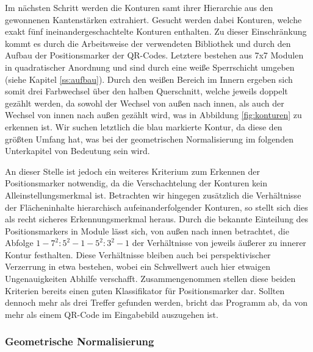 \documentclass[a4paper, oneside, 12pt]{article}
\begin{document}
Im nächsten Schritt werden die Konturen samt ihrer Hierarchie aus den gewonnenen Kantenstärken extrahiert. Gesucht werden dabei Konturen, welche exakt fünf ineinandergeschachtelte Konturen enthalten. Zu dieser Einschränkung kommt es durch die Arbeitsweise der verwendeten Bibliothek und durch den Aufbau der Positionsmarker der QR-Codes. Letztere bestehen aus 7x7 Modulen in quadratischer Anordnung und sind durch eine weiße Sperrschicht umgeben (siehe Kapitel \ref{ss:aufbau}). Durch den weißen Bereich im Innern ergeben sich somit drei Farbwechsel über den halben Querschnitt, welche jeweils doppelt gezählt werden, da sowohl der Wechsel von außen nach innen, als auch der Wechsel von innen nach außen gezählt wird, was in Abbildung \ref{fig:konturen} zu erkennen ist. Wir suchen letztlich die blau markierte Kontur, da diese den größten Umfang hat, was bei der geometrischen Normalisierung im folgenden Unterkapitel von Bedeutung sein wird.

An dieser Stelle ist jedoch ein weiteres Kriterium zum Erkennen der Positionsmarker notwendig, da die Verschachtelung der Konturen kein Alleinstellungsmerkmal ist.
Betrachten wir hingegen zusätzlich die Verhältnisse der Flächeninhalte hierarchisch aufeinanderfolgender Konturen, so stellt sich dies als recht sicheres Erkennungsmerkmal heraus. Durch die bekannte Einteilung des Positionsmarkers in Module lässt sich, von außen nach innen betrachtet, die Abfolge $1 - 7^2:5^2 - 1 - 5^2:3^2 - 1$ der Verhältnisse von jeweils äußerer zu innerer Kontur festhalten.
Diese Verhältnisse bleiben auch bei perspektivischer Verzerrung in etwa bestehen, wobei ein Schwellwert auch hier etwaigen Ungenauigkeiten Abhilfe verschafft.
Zusammengenommen stellen diese beiden Kriterien bereits einen guten Klassifikator für Positionsmarker dar. Sollten dennoch mehr als drei Treffer gefunden werden, bricht das Programm ab, da von mehr als einem QR-Code im Eingabebild auszugehen ist.

\subsubsection{Geometrische Normalisierung}
\end{document}
